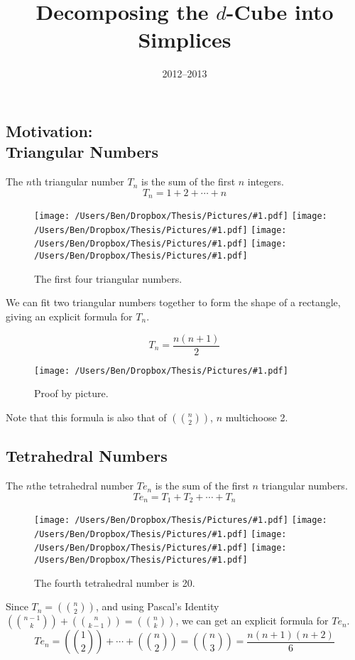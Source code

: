 \documentclass[12pt]{scrippsposter}
\title{Decomposing the $d$-Cube into Simplices}
\date{2012--2013}
\newcommand{\pic}[2]{\texttt{[image: /Users/Ben/Dropbox/Thesis/Pictures/\#1.pdf]}}
\newcommand{\mchoose}[2]{{ \textstyle( \! {#1 \choose #2} \! )}}
\begin{document}
\begin{poster}




\section{Motivation: \\Triangular Numbers}

The $n$th triangular number $T_n$ is the sum of the first $n$ integers.
\begin{equation}
T_n = 1+2+\dotsb+n
\end{equation}

\begin{figure}
\centerline{\hfill\hfill
\pic{1square}{scale=.8}\hfill
\pic{3square}{scale=.8}\hfill
\pic{6square}{scale=.8}\hfill
\pic{10square}{scale=.8}\hfill\hfill
}
\caption{The first four triangular numbers.}
\end{figure}

We can fit two triangular numbers together to form the shape of a rectangle, giving an explicit formula for $T_n$.

\begin{equation}
T_n = \frac{n(n+1)}{2}
\end{equation}

\begin{figure}
\centerline{\pic{sq4by5}{scale=.8}}
\caption{Proof by picture.}
\end{figure}

Note that this formula is also that of $\mchoose{n}{2}$, $n$ multichoose 2.

\subsection{Tetrahedral Numbers}

The $n$the tetrahedral number $Te_n$ is the sum of the first $n$ triangular numbers.
\begin{equation}
Te_n = T_1+T_2+\dotsb+T_n
\end{equation}

\begin{figure}
\centerline{\hfill
\pic{numstack1}{scale=.5}\hfill
\pic{numstack2}{scale=.5}\hfill
\pic{numstack3}{scale=.5}\hfill
\pic{numstack4}{scale=.5}\hfill
}
\caption{The fourth tetrahedral number is 20.}
\end{figure}

Since $T_n = \mchoose{n}{2}$, and using Pascal's Identity $\mchoose{n-1}{k} + \mchoose{n}{k-1} = \mchoose{n}{k}$, we can get an explicit formula for $Te_n$.
\begin{equation}
Te_n = \mchoose{1}{2}+\dotsb+\mchoose{n}{2} =\mchoose{n}{3} = \frac{n(n+1)(n+2)}{6}
\end{equation}


\end{poster}
\end{document}
